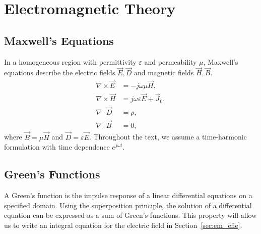 \section{Electromagnetic Theory}

\subsection{Maxwell's Equations}
In a homogeneous region with permittivity $\varepsilon$ and permeability $\mu$, Maxwell's equations describe the electric fields $\vec{E}, \vec{D}$ and magnetic fields $\vec{H}, \vec{B}$.
\begin{align}
	\nabla \times \vec{E} & = -j\omega\mu\vec{H}, \label{eq:maxwell_E} \\
	\nabla \times \vec{H} & = j\omega\varepsilon\vec{E} + \vec{J}_0, \label{eq:maxwell_H} \\
	\nabla \cdot \vec{D} & = \rho, \label{eq:maxwell_D} \\
	\nabla \cdot \vec{B} & = 0, \label{eq:maxwell_B}
\end{align}
where $\vec{B} = \mu \vec{H}$ and $\vec{D} = \varepsilon \vec{E}$. Throughout the text, we assume a time-harmonic formulation with time dependence $e^{j\omega t}$.

\subsection{Green's Functions}
A Green's function is the impulse response of a linear differential equations on a specified domain. Using the superposition principle, the solution of a differential equation can be expressed as a sum of Green's functions. This property will allow us to write an integral equation for the electric field in Section~\ref{sec:em_efie}.

